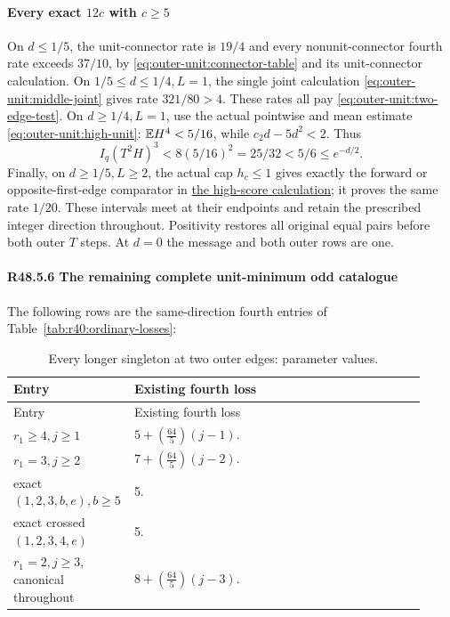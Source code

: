 \paragraph{Every exact \(12c\) with \(c\ge5\)}\label{part:R48.5.5}
On \(d\le1/5\), the unit-connector rate is \(19/4\) and every
nonunit-connector fourth rate exceeds \(37/10\), by
\eqref{eq:outer-unit:connector-table} and its unit-connector calculation.
On \(1/5\le d\le1/4,L=1\), the single joint calculation
\eqref{eq:outer-unit:middle-joint} gives rate \(321/80>4\).
These rates all pay \eqref{eq:outer-unit:two-edge-test}.
On \(d\ge1/4,L=1\), use the actual pointwise and mean estimate
\eqref{eq:outer-unit:high-unit}: \(\mathbb E H^4<5/16\), while
\(c_2d-5d^2<2\). Thus
\begin{equation}\label{eq:outer-unit:high-outer}
 I_q(T^2H)^3<8(5/16)^2=25/32<5/6\le e^{-d/2}.
\end{equation}
Finally, on \(d\ge1/5,L\ge2\), the actual cap \(h_c\le1\)
gives exactly the forward or opposite-first-edge comparator in
\hyperref[part:R48.4.4]{the high-score calculation}; it proves the
same rate \(1/20\).
These intervals meet at their endpoints and retain the prescribed
integer direction throughout. Positivity restores all original equal
pairs before both outer \(T\) steps. At \(d=0\) the message and both
outer rows are one.

\paragraph{R48.5.6 The remaining complete unit-minimum odd catalogue}

The following rows are the same-direction fourth entries of Table~\ref{tab:r40:ordinary-losses}:


\begingroup\small
\setlength{\tabcolsep}{3pt}
\setlength{\LTleft}{0pt}\setlength{\LTright}{\fill}
\begin{longtable}{@{}p{0.2200\linewidth}p{0.7000\linewidth}@{}}
\caption{Every longer singleton at two outer edges: parameter values.}\label{tab:parameters:r2-c048:5}\\
\toprule
Entry & Existing fourth loss \\
\midrule\endfirsthead
\toprule
Entry & Existing fourth loss \\
\midrule\endhead
\bottomrule\endfoot
\(r_1\ge 4,\allowbreak \allowbreak  j\ge 1\) & \(5+(\frac{64}{5})(j-1)\). \\
\addlinespace[2pt]
\(r_1=3,\allowbreak \allowbreak  j\ge 2\) & \(7+(\frac{64}{5})(j-2)\). \\
\addlinespace[2pt]
exact \((1,\allowbreak \allowbreak 2,\allowbreak \allowbreak 3,\allowbreak \allowbreak b,\allowbreak \allowbreak e),\allowbreak \allowbreak  b\ge 5\) & 5. \\
\addlinespace[2pt]
exact crossed \((1,\allowbreak \allowbreak 2,\allowbreak \allowbreak 3,\allowbreak \allowbreak 4,\allowbreak \allowbreak e)\) & 5. \\
\addlinespace[2pt]
\(r_1=2,\allowbreak \allowbreak  j\ge 3\), canonical throughout & \(8+(\frac{64}{5})(j-3)\). \\
\end{longtable}
\endgroup


